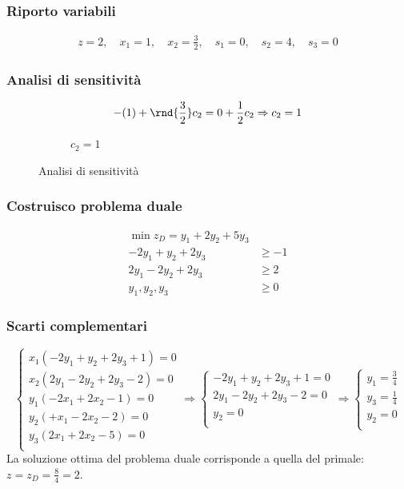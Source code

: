 \documentclass[\main/main.tex]{subfiles}
\begin{document}
\subsubsection*{Riporto variabili}
\begin{align*}
  z = 2, \quad
  x_1 = 1, \quad
  x_2 = \frac{3}{2}, \quad
  s_1 = 0, \quad
  s_2 = 4, \quad
  s_3 = 0
\end{align*}
\subsubsection*{Analisi di sensitività}

\begin{figure}
  \begin{subfigure}{0.49\textwidth}
    \[
      -(1) + \rnd{\frac{3}{2}}c_2 = 0 + \frac{1}{2}c_2 \Rightarrow c_2 = 1
    \]
  \end{subfigure}
  \begin{subfigure}{0.49\textwidth}
    \caption{$c_2 = 1$}
  \end{subfigure}
  \caption{Analisi di sensitività}
\end{figure}

\subsubsection*{Costruisco problema duale}
\begin{align*}
  \min z_D = y_1 + 2y_2 + 5y_3 \\
  -2y_1 + y_2 + 2y_3 & \geq -1 \\
  2y_1 -2y_2 + 2y_3  & \geq 2  \\
  y_1, y_2, y_3      & \geq 0
\end{align*}
\subsubsection*{Scarti complementari}
\[
  \begin{cases}
    x_1(-2y_1 + y_2 + 2y_3  +1) = 0 \\
    x_2(2y_1 -2y_2 + 2y_3  -2 ) = 0 \\
    y_1(-2x_1 + 2x_2 -1) = 0        \\
    y_2(+x_1 - 2x_2  -2) = 0        \\
    y_3(2x_1 + 2x_2  -5) = 0        \\
  \end{cases}
  \Rightarrow
  \begin{cases}
    -2y_1 + y_2 + 2y_3  +1 = 0 \\
    2y_1 -2y_2 + 2y_3  -2  = 0 \\
    y_2 = 0                    \\
  \end{cases}
  \Rightarrow
  \begin{cases}
    y_1 = \frac{3}{4} \\
    y_3 = \frac{1}{4} \\
    y_2 = 0           \\
  \end{cases}
\]
La soluzione ottima del problema duale corrisponde a quella del primale: $z = z_D = \frac{8}{4} = 2$.
\end{document}
